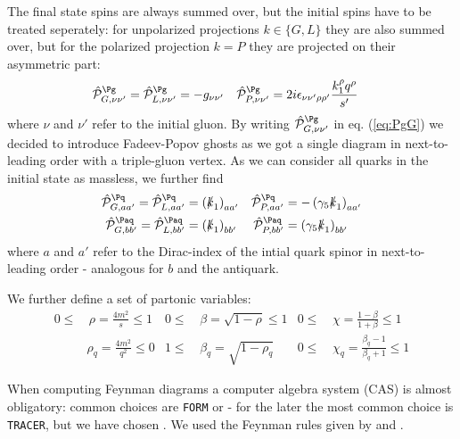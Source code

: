 The final state spins are always summed over, but the initial spins have to be treated seperately: for unpolarized projections $k\in\{G,L\}$ they are also summed over, but for the polarized projection $k=P$ they are projected on their asymmetric part:
\begin{align}
\hat {\mathcal P}^{\Pg}_{G,\nu\nu'} = \hat {\mathcal P}^{\Pg}_{L,\nu\nu'} &= -g_{\nu\nu'} &\hat {\mathcal P}^{\Pg}_{P,\nu\nu'} &= 2i\epsilon_{\nu\nu'\rho\rho'}\frac{k_1^{\rho}q^{\rho}}{s'}\label{eq:PgG}
\end{align}
where $\nu$ and $\nu'$ refer to the initial gluon. By writing $\hat {\mathcal P}^{\Pg}_{G,\nu\nu'}$ in eq. (\ref{eq:PgG}) we decided to introduce Fadeev-Popov ghosts\cite{Bojak:2000eu} as we got a single diagram in next-to-leading order with a triple-gluon vertex. As we can consider all quarks in the initial state as massless, we further find
\begin{align}
\hat {\mathcal P}^{\Pq}_{G,aa'} = \hat {\mathcal P}^{\Pq}_{L,aa'} &= \left(\slashed k_1\right)_{aa'}
&\hat {\mathcal P}^{\Pq}_{P,aa'} &= -\left(\gamma_5\slashed k_1\right)_{aa'}\\
\hat {\mathcal P}^{\Paq}_{G,bb'} = \hat {\mathcal P}^{\Paq}_{L,bb'} &= \left(\slashed k_1\right)_{bb'}
&\hat {\mathcal P}^{\Paq}_{P,bb'} &= \left(\gamma_5\slashed k_1\right)_{bb'}
\end{align}
where $a$ and $a'$ refer to the Dirac-index of the intial quark spinor in next-to-leading order - analogous for $b$ and the antiquark.

We further define a set of partonic variables:
\begin{align}
0\leq&\,\rho = \frac {4m^2} s\leq 1 &0\leq&\,\beta = \sqrt{1-\rho}\leq 1 &0\leq&\,\chi = \frac{1-\beta}{1+\beta}\leq 1\\
&\rho_q = \frac {4m^2} {q^2}\leq 0 &1\leq&\,\beta_q = \sqrt{1-\rho_q} &0\leq&\,\chi_q = \frac{\beta_q-1}{\beta_q+1}\leq 1
\end{align}

When computing Feynman diagrams a computer algebra system (CAS) is almost obligatory: common choices are \texttt{FORM}\cite{Vermaseren:2000nd} or \MMa\cite{Mathematica} - for the later the most common choice is \texttt{TRACER}\cite{Tracer}, but we have chosen \HEPMath\cite{wiebusch_hepmath_2015}. We used the Feynman rules given by \cite{Leader} and \cite{Bojak:2000eu}.
